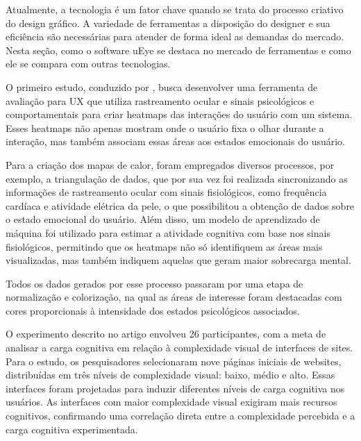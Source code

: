 Atualmente, a tecnologia é um fator chave quando se trata do processo criativo do design gráfico. A variedade de ferramentas a disposição do designer e sua eficiência são necessárias para atender de forma ideal as demandas do mercado. Nesta seção, como o software uEye se destaca no mercado de ferramentas e como ele se compara com outras tecnologias.


O primeiro estudo, conduzido por \textcite{GEORGES2016}, busca desenvolver uma ferramenta de avaliação para UX que utiliza rastreamento ocular e sinais psicológicos e comportamentais para criar heatmaps das interações do usuário com um sistema. Esses heatmaps não apenas mostram onde o usuário fixa o olhar durante a interação, mas também associam essas áreas aos estados emocionais do usuário.

Para a criação dos mapas de calor, foram empregados diversos processos, por exemplo, a triangulação de dados, que por sua vez foi realizada sincronizando as informações de rastreamento ocular com sinais fisiológicos, como frequência cardíaca e atividade elétrica da pele, o que possibilitou a obtenção de dados sobre o estado emocional do usuário. Além disso, um modelo de aprendizado de máquina foi utilizado para estimar a atividade cognitiva com base nos sinais fisiológicos, permitindo que os heatmaps não só identifiquem as áreas mais visualizadas, mas também indiquem aquelas que geram maior sobrecarga mental. 

Todos os dados gerados por esse processo passaram por uma etapa de normalização e colorização, na qual as áreas de interesse foram destacadas com cores proporcionais à intensidade dos estados psicológicos associados.

O experimento descrito no artigo envolveu 26 participantes, com a meta de analisar a carga cognitiva em relação à complexidade visual de interfaces de sites. Para o estudo, os pesquisadores selecionaram nove páginas iniciais de websites, distribuídas em três níveis de complexidade visual: baixo, médio e alto. Essas interfaces foram projetadas para induzir diferentes níveis de carga cognitiva nos usuários. As interfaces com maior complexidade visual exigiram mais recursos cognitivos, confirmando uma correlação direta entre a complexidade percebida e a carga cognitiva experimentada.

